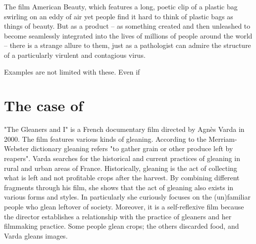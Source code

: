 


The film American Beauty, which features a long, poetic clip of a plastic bag swirling on an eddy of air yet people find it hard to think of plastic bags as things of beauty. But as a product -- as something created and then unleashed to become seamlessly integrated into the lives of millions of people around the world -- there is a strange allure to them, just as a pathologist can admire the structure of a particularly virulent and contagious virus.

Examples are not limited with these. Even if 





%
%
\section{The case of }
"The Gleaners and I" is a French documentary film directed by Agnès Varda in 2000. The film features various kinds of gleaning. According to the Merriam-Webster dictionary gleaning refers "to gather grain or other produce left by reapers". Varda searches for the historical and current practices of gleaning in rural and urban areas of France. Historically, gleaning is the act of collecting what is left and not profitable crops after the harvest. By combining different fragments through his film, she shows that the act of gleaning also exists in various forms and styles. In particularly she curiously focuses on the (un)familiar people who glean leftover of society. Moreover, it is a self-reflexive film because the director establishes a relationship with the practice of gleaners and her filmmaking practice. Some people glean crops; the others discarded food, and Varda gleans images.


